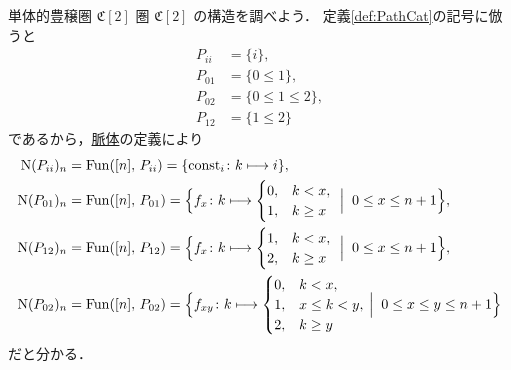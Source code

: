 \documentclass[TQFT_main]{subfiles}
\begin{document}
\begin{myexample}[label=ex:PathCat2]{単体的豊穣圏 {$\mathfrak{C}[2]$}}
    圏 \hyperref[def:PathCat]{$\mathfrak{C}[2]$} の構造を調べよう．
    定義\ref{def:PathCat}の記号に倣うと
    \begin{align}
        P_{ii} &= \{i\}, \\
        P_{01} &= \{0 \le 1\}, \\
        P_{02} &= \{0 \le 1 \le 2\}, \\
        P_{12} &= \{1 \le 2\}
    \end{align}
    であるから，\hyperref[def:nerve]{脈体}の定義により
    \begin{align}
        \mathrm{N}(P_{ii})_n &= \mathrm{Fun}([n],\, P_{ii}) = \{\mathrm{const}_{i} \colon k \longmapsto i\}, \\
        \mathrm{N}(P_{01})_n &= \mathrm{Fun}([n],\, P_{01}) = 
        \Bigl\{ 
            f_{x} \colon k \longmapsto
            \begin{cases}
                0, &k < x, \\
                1, &k \ge x
            \end{cases}\;
        \Bigm|\; 0 \le x \le n+1
        \Bigr\}, \\
        \mathrm{N}(P_{12})_n &= \mathrm{Fun}([n],\, P_{12}) = 
        \Bigl\{ 
            f_{x} \colon k \longmapsto
            \begin{cases}
                1, &k < x, \\
                2, &k \ge x
            \end{cases}\;
        \Bigm|\; 0 \le x \le n+1
        \Bigr\}, \\
        \mathrm{N}(P_{02})_n &= \mathrm{Fun}([n],\, P_{02}) = 
        \Bigl\{ 
            f_{xy} \colon k \longmapsto 
            \begin{cases}
                0, &k < x, \\
                1, &x \le k < y, \\
                2, &k \ge y
            \end{cases}
        \Bigm|\; 0 \le x \le y \le n+1
         \Bigr\} 
    \end{align}
    だと分かる．
\end{myexample}
\end{document}
